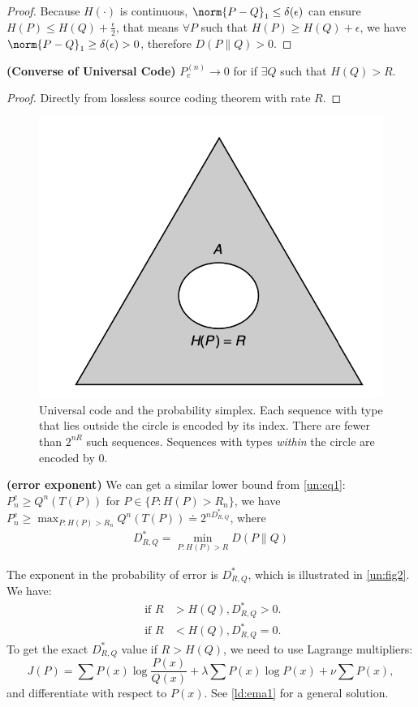 \documentclass{article}
\newcommand{\one}[1]{\norm{#1}_{1}}
\newcommand{\bfs}[1]{\textbf{({#1})}}
\begin{document}
\begin{proof}
Because $H(\cdot)$ is continuous, $\one{P-Q} \leq \delta(\epsilon)$ can
ensure $H(P) \leq H(Q)+\frac{\epsilon}{2}$, that means $\forall P$ such that  $H(P) \ge H(Q)+\epsilon$, we have $\one{P-Q} \ge \delta(\epsilon)>0$, therefore  $D(P \| Q)>0$.
\end{proof}
\begin{thma}{\bfs{Converse of Universal Code}}
$P_{e}^{(n)} \rightarrow 0$ for if $\exists Q$  such that $H(Q)>R$.
\end{thma}
\begin{proof}
Directly from lossless source coding theorem with rate $R$.
\end{proof}

\begin{figure}[ht]
 \centering
 \includegraphics[width=0.5\linewidth]{Figs/fig1.png}
\centering
\caption{Universal code and the probability simplex. Each sequence with type that lies outside the circle is encoded by its index. There are fewer than $2^{nR}$ such sequences. Sequences with types \emph{within} the circle are encoded by $0$.}
		\label{un:fig1}
\end{figure}

\begin{rema}{\bfs{error exponent}}
We can get a similar lower bound from \cref{un:eq1}: $P^e_{n}\ge  Q^{n}(T(P)) $ for $P\in \{P: H(P)>R_{n}\}$, we have $P^e_{n}\ge \max_{{P: H(P)>R_{n}}} Q^{n}(T(P))\doteq 2^{nD^*_{R,Q}}$, where
\begin{align*}
D_{R, Q}^{*}=\min _{P: H(P)>R} D(P \| Q)
\end{align*}

The exponent in the probability of error is $D_{R, Q}^{*}$, which is illustrated in \cref{un:fig2}. We have: 
  \begin{align*}
       \text{ if } R&>H(Q),  D_{R, Q}^{*}>0.\\
      \text{ if } R&<H(Q), D_{R, Q}^{*}=0.
  \end{align*}
To get the exact $D_{R, Q}^{*}$ value if $R>H(Q)$, we need to use Lagrange multipliers:$$J(P)=\sum P(x) \log \frac{P(x)}{Q(x)}+\lambda \sum P(x) \log P(x)+\nu \sum P(x),$$ and differentiate with respect to $P(x)$. See \cref{ld:ema1} for a general solution.
  
\end{rema}
\end{document}
